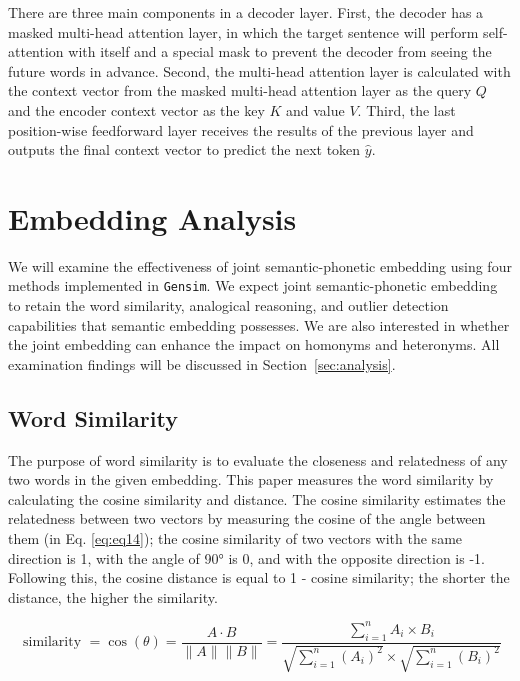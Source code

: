 There are three main components in a decoder layer. First, the decoder has a masked multi-head attention layer, in which the target sentence will perform self-attention with itself and a special mask to prevent the decoder from seeing the future words in advance. Second, the multi-head attention layer is calculated with the context vector from the masked multi-head attention layer as the query $Q$ and the encoder context vector as the key $K$ and value $V$. Third, the last position-wise feedforward layer receives the results of the previous layer and outputs the final context vector to predict the next token $\hat{y}$.

\section{Embedding Analysis} \label{sec:embedding_analysis}

We will examine the effectiveness of joint semantic-phonetic embedding using four methods implemented in \texttt{Gensim}. We expect joint semantic-phonetic embedding to retain the word similarity, analogical reasoning, and outlier detection capabilities that semantic embedding possesses. We are also interested in whether the joint embedding can enhance the impact on homonyms and heteronyms. All examination findings will be discussed in Section~\ref{sec:analysis}.

\subsection{Word Similarity} \label{sec:similarity}

The purpose of word similarity is to evaluate the closeness and relatedness of any two words in the given embedding. This paper measures the word similarity by calculating the cosine similarity and distance. The cosine similarity estimates the relatedness between two vectors by measuring the cosine of the angle between them (in Eq. \ref{eq:eq14}); the cosine similarity of two vectors with the same direction is 1, with the angle of 90° is 0, and with the opposite direction is -1. Following this, the cosine distance is equal to 1 - cosine similarity; the shorter the distance, the higher the similarity.

\begin{equation}
    \text { similarity }=\cos (\theta)=\frac{A \cdot B}{\|A\|\|B\|}=\frac{\sum_{i=1}^{n} A_{i} \times B_{i}}{\sqrt{\sum_{i=1}^{n}\left(A_{i}\right)^{2}} \times \sqrt{\sum_{i=1}^{n}\left(B_{i}\right)^{2}}} \label{eq:eq14}
\end{equation}

